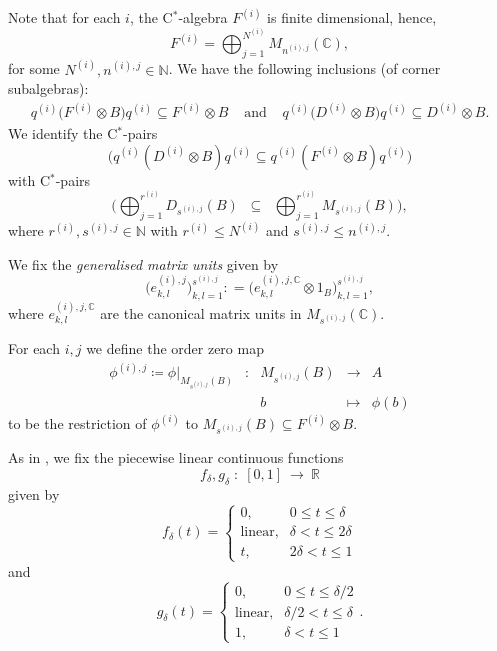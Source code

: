 \documentclass[a4paper]{amsart}
\newcommand{\myhyp}{\textnormal{-}\hskip0pt\relax}
\numberwithin{equation}{section}
\newcommand{\N}{\mathbb{N}}
\newcommand{\C}{\mathbb{C}}
\newcommand{\cstar}{C$^\ast$\myhyp{}algebra}
\newcommand{\cstarPair}{C$^\ast$\myhyp{}pair}
\newcommand{\rAr}{\longrightarrow}
\newcommand{\prn}[1]{{(#1)}}
\theoremstyle{plain}
\theoremstyle{indented}
\numberwithin{equation}{section}
\theoremstyle{definition}
\theoremstyle{remark}
\theoremstyle{plain}
\theoremstyle{definition}
\begin{document}
\smallskip
   
Note that for each $i$, the \cstar{} $F^{\prn{i}}$ is finite dimensional,
hence,
\begin{equation*}
        F^{\prn{i}} = \bigoplus_{j=1}^{N^\prn{i}} M_{n^{(i),j}}(\C),
\end{equation*}
for some $N^{\prn{i}}, n^{(i),j}\in \N$. 
We have the following inclusions ({of corner subalgebras}):
\[\begin{array}{ccc}
    q^{\prn{i}} \big( F^{(i)} \otimes B \big) q^{\prn{i}} \subseteq F^{(i)} \otimes B 
    & \text{ and } &
    q^{\prn{i}} \big( D^{(i)} \otimes B \big) q^{\prn{i}} \subseteq D^{(i)} \otimes B. 
\end{array}\] 
We identify the \cstarPair{}s 
\[\big(  q^{\prn{i}} ( D^{(i)} \otimes B ) q^{\prn{i}}  \subseteq  q^{\prn{i}} ( F^{(i)} \otimes B ) q^{\prn{i}} \big)\]
with \cstarPair{}s
\[ \Bigg( \bigoplus_{j=1}^{r^{(i)}} D_{s^{(i),j}}(B) \; \; {\subseteq}  \; \;  \bigoplus_{j=1}^{r^{(i)}} M_{s^{(i),j}}( B)   \Bigg),\]
where $r^{\prn{i}}, s^{(i),j} \in \N$ with $r^{\prn{i}} \le N^\prn{i}$ and $s^{(i),j} \le n^{(i),j}$.
    
We fix the \emph{generalised matrix units} given by
\begin{equation} \label{eq:genMatrixUnits}
       \Big( e_{k,l}^{(i),j} \Big)_{k,l=1}^{s^{(i),j}} : = \Big( e_{k,l}^{(i),j,\mathbb{C}} \otimes 1_B \Big)_{k,l=1}^{s^{(i),j}},
\end{equation}
where $e_{k,l}^{(i),j,\mathbb{C}}$ are the canonical matrix units in $ M_{s^{(i),j}}(\mathbb{C})$. 
    
For each $i,j$ we define the order zero map
\begin{equation} \label{eq:orderZeroMaps(i,j)}
        \begin{array}{ccccc} 
            \phi^{(i),j} \coloneq \phi\vert_{M_{s^{(i),j}}(B)} & \colon & M_{s^{(i),j}}(B) & \rAr & A \\
            & & b &\longmapsto & \phi(b)  
        \end{array}
\end{equation}
to be the restriction of $\phi^\prn{i}$ to $ M_{s^{(i),j}}(B) \subseteq F^{(i)} \otimes B$. 

As in \cite[Section~5]{LiLiaoWinter2023diagDim}, 
we fix the piecewise linear continuous functions 
\[{f_\delta, g_\delta \; : \; [0,1]~\rAr~\mathbb{R}}\] given by
\begin{equation}
    f_{\delta}(t) = \begin{cases}
        0 , & 0\le t\le \delta\\
        \text{linear} , & \delta < t \le 2 \delta \\
        t , & 2\delta <t \le 1
    \end{cases}
\end{equation}
and
\begin{equation}
    g_{\delta}(t) = \begin{cases}
        0 , & 0\le t\le \delta/2 \\
        \text{linear} , & \delta/2 < t \le  \delta \\
        1 , & \delta <t \le 1
    \end{cases}.
\end{equation}
    
\end{document}

